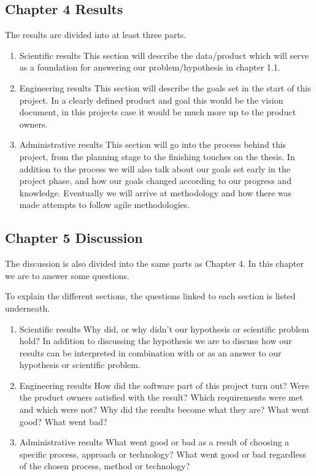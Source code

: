 \subsection{Chapter 4 Results}
The results are divided into at least three parts. \\
\begin{enumerate}
    \item Scientific results
    This section will describe the data/product which will serve as a foundation for answering our problem/hypothesis in chapter 1.1.
    
    \item Engineering results
    This section will describe the goals set in the start of this project. In a clearly defined product and goal this would be the vision document, in this projects case it would be much more up to the product owners. %
    
    \item Administrative results
    This section will go into the process behind this project, from the planning stage to the finishing touches on the thesis. In addition to the process we will also talk about our goals set early in the project phase, and how our goals changed according to our progress and knowledge. Eventually we will arrive at methodology and how there was made attempts to follow agile methodologies.
    
\end{enumerate}

\subsection{Chapter 5 Discussion}
The discussion is also divided into the same parts as Chapter 4. %
In this chapter we are to answer some questions.

To explain the different sections, the questions linked to each section is listed underneath.
\begin{enumerate}
    \item Scientific results
    Why did, or why didn't our hypothesis or scientific problem hold?
    In addition to discussing the hypothesis we are to discuss how our results can be interpreted in combination with or as an answer to our hypothesis or scientific problem.
    
    \item Engineering results
    How did the software part of this project turn out? Were the product owners satisfied with the result? Which requirements were met and which were not? Why did the results become what they are? What went good? What went bad?
    
    \item Administrative results
    What went good or bad as a result of choosing a specific process, approach or technology? What went good or bad regardless of the chosen process, method or technology?
    
\end{enumerate}

